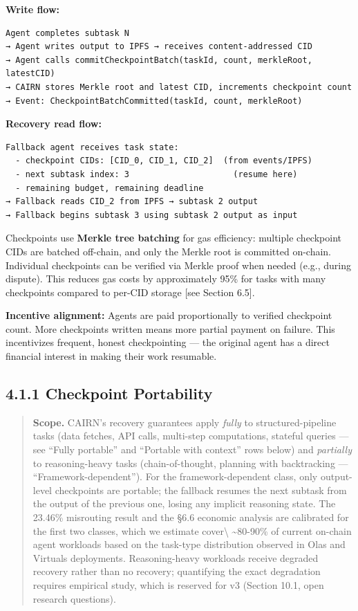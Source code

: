 \documentclass[
  10pt,
]{article}
\begin{document}
\textbf{Write flow:}

\begin{verbatim}
Agent completes subtask N
→ Agent writes output to IPFS → receives content-addressed CID
→ Agent calls commitCheckpointBatch(taskId, count, merkleRoot, latestCID)
→ CAIRN stores Merkle root and latest CID, increments checkpoint count
→ Event: CheckpointBatchCommitted(taskId, count, merkleRoot)
\end{verbatim}

\textbf{Recovery read flow:}

\begin{verbatim}
Fallback agent receives task state:
  - checkpoint CIDs: [CID_0, CID_1, CID_2]  (from events/IPFS)
  - next subtask index: 3                     (resume here)
  - remaining budget, remaining deadline
→ Fallback reads CID_2 from IPFS → subtask 2 output
→ Fallback begins subtask 3 using subtask 2 output as input
\end{verbatim}

Checkpoints use \textbf{Merkle tree batching} for gas efficiency:
multiple checkpoint CIDs are batched off-chain, and only the Merkle root
is committed on-chain. Individual checkpoints can be verified via Merkle
proof when needed (e.g., during dispute). This reduces gas costs by
approximately 95\% for tasks with many checkpoints compared to per-CID
storage {[}see Section 6.5{]}.

\textbf{Incentive alignment:} Agents are paid proportionally to verified
checkpoint count. More checkpoints written means more partial payment on
failure. This incentivizes frequent, honest checkpointing --- the
original agent has a direct financial interest in making their work
resumable.

\hypertarget{checkpoint-portability}{%
\subsection{4.1.1 Checkpoint Portability}\label{checkpoint-portability}}

\begin{quote}
\textbf{Scope.} CAIRN's recovery guarantees apply \emph{fully} to
structured-pipeline tasks (data fetches, API calls, multi-step
computations, stateful queries --- see ``Fully portable'' and ``Portable
with context'' rows below) and \emph{partially} to reasoning-heavy tasks
(chain-of-thought, planning with backtracking ---
``Framework-dependent''). For the framework-dependent class, only
output-level checkpoints are portable; the fallback resumes the next
subtask from the output of the previous one, losing any implicit
reasoning state. The 23.46\% misrouting result and the §6.6 economic
analysis are calibrated for the first two classes, which we estimate
cover\textbackslash{} \textasciitilde80-90\% of current on-chain agent
workloads based on the task-type distribution observed in Olas and
Virtuals deployments. Reasoning-heavy workloads receive degraded
recovery rather than no recovery; quantifying the exact degradation
requires empirical study, which is reserved for v3 (Section 10.1, open
research questions).
\end{quote}
\end{document}
